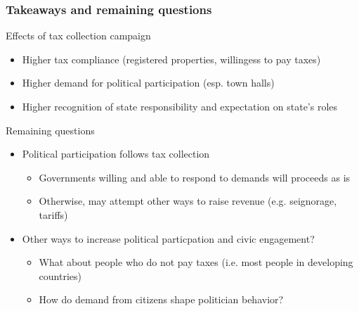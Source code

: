 \documentclass[aspectratio=169]{beamer}
\begin{document}
\begin{frame}
\frametitle{Takeaways and remaining questions}
Effects of tax collection campaign
\begin{itemize}\setlength\itemsep{3pt}
\item Higher tax compliance (registered properties, willingess to pay taxes)
\item Higher demand for political participation (esp. town halls)
\item Higher recognition of state responsibility and expectation on state's roles
\end{itemize}\medskip
Remaining questions
\begin{itemize}\setlength\itemsep{3pt}
\item Political participation follows tax collection
\begin{itemize}\setlength\itemsep{3pt}
  \item Governments willing and able to respond to demands will proceeds as is
  \item Otherwise, may attempt other ways to raise revenue (e.g. seignorage, tariffs)
\end{itemize}
\item Other ways to increase political particpation and civic engagement?
\begin{itemize}\setlength\itemsep{3pt}
  \item What about people who do not pay taxes (i.e. most people in developing countries)
  \item How do demand from citizens shape politician behavior?
\end{itemize}
\end{itemize}
\end{frame}
\end{document}
